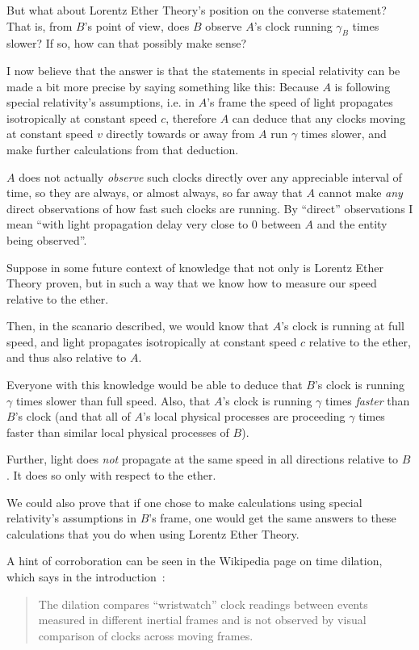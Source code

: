 \documentclass[a4paper]{article}
\theoremstyle{plain}
\theoremstyle{definition}
\begin{document}
But what about Lorentz Ether Theory's position on the converse
statement?  That is, from $B$'s point of view, does $B$ observe $A$'s
clock running $\gamma_B$ times slower?  If so, how can that possibly
make sense?

I now believe that the answer is that the statements in special
relativity can be made a bit more precise by saying something like
this: Because $A$ is following special relativity's assumptions,
i.e. in $A$'s frame the speed of light propagates isotropically at
constant speed $c$, therefore $A$ can deduce that any clocks moving at
constant speed $v$ directly towards or away from $A$ run $\gamma$
times slower, and make further calculations from that deduction.

$A$ does not actually {\em observe} such clocks directly over any
appreciable interval of time, so they are always, or almost always, so
far away that $A$ cannot make {\em any} direct observations of how
fast such clocks are running.  By ``direct'' observations I mean
``with light propagation delay very close to 0 between $A$ and the
entity being observed''.

Suppose in some future context of knowledge that not only is Lorentz
Ether Theory proven, but in such a way that we know how to measure our
speed relative to the ether.

Then, in the scanario described, we would know that $A$'s clock is
running at full speed, and light propagates isotropically at constant
speed $c$ relative to the ether, and thus also relative to $A$.

Everyone with this knowledge would be able to deduce that $B$'s clock
is running $\gamma$ times slower than full speed.  Also, that
$A$'s clock is running $\gamma$ times {\em faster} than $B$'s clock
(and that all of $A$'s local physical processes are proceeding
$\gamma$ times faster than similar local physical processes of $B$).

Further, light does {\em not} propagate at the same speed in all
directions relative to $B$.  It does so only with respect to the
ether.

We could also prove that if one chose to make calculations using
special relativity's assumptions in $B$'s frame, one would get the
same answers to these calculations that you do when using Lorentz
Ether Theory.

A hint of corroboration can be seen in the Wikipedia page on time
dilation, which says in the introduction~\cite{WikipediaTimeDilation}:
\begin{quote}
The dilation compares ``wristwatch'' clock readings between events
measured in different inertial frames and is not observed by visual
comparison of clocks across moving frames.
\end{quote}
\end{document}

